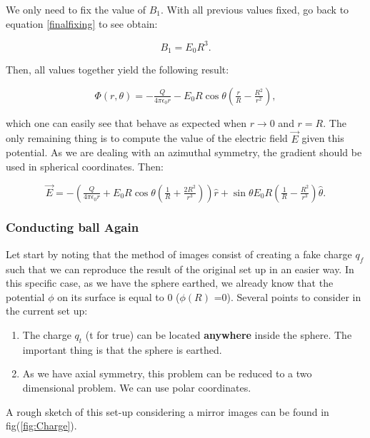 We only need to fix the value of $B_{1}$. With all previous values fixed, go back to equation \ref{finalfixing} to see obtain:

\begin{equation}
	B_{1} = E_{0} R^{3}.
\end{equation}

Then, all values together yield the following result:

\begin{equation}
	\Phi(r,\theta) = - \tfrac{Q}{4 \pi \epsilon_{0} r} - E_{0} R \cos \theta \left(\tfrac{r}{R} - \tfrac{R^{2}}{r^{2}}\right),
\end{equation}

which one can easily see that behave as expected when $r\rightarrow 0$ and $r =R$. The only remaining thing is to compute the value of the electric field $\vec{E}$ given this potential. As we are dealing with an azimuthal symmetry, the gradient should be used in spherical coordinates.  Then:

\begin{equation}
	\vec{E} = -\left(\tfrac{Q}{4 \pi \epsilon_{0} r} + E_{0} R \cos \theta \left(\tfrac{1}{R} + \tfrac{2R^{2}}{r^{3}}\right)\right) \hat{r} + \sin \theta E_{0} R \left(\tfrac{1}{R} - \tfrac{R^{2}}{r^{3}}\right) \hat{\theta}.
\end{equation}

\subsubsection{Conducting ball Again}\label{Conducting ball Again}
Let start by noting that the method of images consist of creating a fake charge $q_{f}$ such that we can reproduce the result of the original set up in an easier way. In this specific case, as we have the sphere earthed, we already know that the potential $\phi$ on its surface is equal to 0 ($\phi(R)$ =0). Several points to consider in the current set up:

\begin{enumerate}
	\item The charge $q_{t}$ (t for true) can be located \textbf{anywhere} inside the sphere. The important thing is that the sphere is earthed.
	\item As we have axial symmetry, this problem can be reduced to a two dimensional problem. We can use polar coordinates.
\end{enumerate}

A rough sketch of this set-up considering a mirror images can be found in fig(\ref{fig:Charge}).

